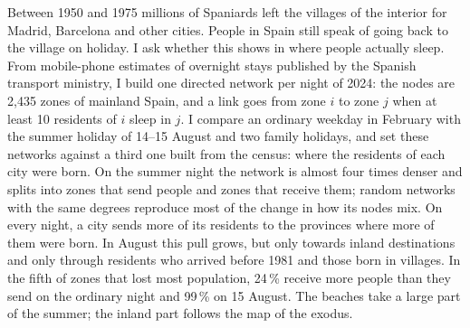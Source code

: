 Between 1950 and 1975 millions of Spaniards left the villages of the interior for Madrid, Barcelona and other cities. People in Spain still speak of going back to the village on holiday. I ask whether this shows in where people actually sleep. From mobile-phone estimates of overnight stays published by the Spanish transport ministry, I build one directed network per night of 2024: the nodes are 2,435 zones of mainland Spain, and a link goes from zone $i$ to zone $j$ when at least 10 residents of $i$ sleep in $j$. I compare an ordinary weekday in February with the summer holiday of 14--15 August and two family holidays, and set these networks against a third one built from the census: where the residents of each city were born. On the summer night the network is almost four times denser and splits into zones that send people and zones that receive them; random networks with the same degrees reproduce most of the change in how its nodes mix. On every night, a city sends more of its residents to the provinces where more of them were born. In August this pull grows, but only towards inland destinations and only through residents who arrived before 1981 and those born in villages. In the fifth of zones that lost most population, 24\,\% receive more people than they send on the ordinary night and 99\,\% on 15 August. The beaches take a large part of the summer; the inland part follows the map of the exodus.
